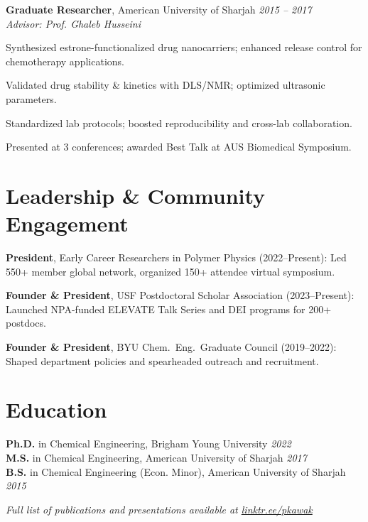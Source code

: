 \documentclass[letterpaper,12pt]{article}
\begin{document}
\textbf{Graduate Researcher}, American University of Sharjah \hfill \textit{2015 – 2017} \\
\textit{Advisor: Prof. Ghaleb Husseini}
\begin{tabitemize}[leftmargin=*]
  \item Synthesized estrone-functionalized drug nanocarriers; enhanced release control for chemotherapy applications.
  \item Validated drug stability \& kinetics with DLS/NMR; optimized ultrasonic parameters.
  \item Standardized lab protocols; boosted reproducibility and cross-lab collaboration.
  \item Presented at 3 conferences; awarded Best Talk at AUS Biomedical Symposium.
\end{tabitemize}

\vspace{-0.3\baselineskip}
\section*{Leadership \& Community Engagement}
\begin{tabitemize}[leftmargin=*]
  \item \textbf{President}, Early Career Researchers in Polymer Physics (2022–Present): Led 550+ member global network, organized 150+ attendee virtual symposium.
  \item \textbf{Founder \& President}, USF Postdoctoral Scholar Association (2023–Present): Launched NPA-funded ELEVATE Talk Series and DEI programs for 200+ postdocs.
  \item \textbf{Founder \& President}, BYU Chem.~Eng.~Graduate Council (2019–2022): Shaped department policies and spearheaded outreach and recruitment.
\end{tabitemize}

\vspace{-0.3\baselineskip}
\begin{refsection}[articles]
  \nocite{*}
  \setlength\bibitemsep{0pt}
  \printbibliography[resetnumbers=true,type=article,title={Selected Peer-Reviewed Publications},heading=fix]
\end{refsection}

\vspace{-0.3\baselineskip}
\section*{Education}
\textbf{Ph.D.} in Chemical Engineering, Brigham Young University \hfill \textit{2022} \\
\textbf{M.S.} in Chemical Engineering, American University of Sharjah \hfill \textit{2017} \\
\textbf{B.S.} in Chemical Engineering (Econ. Minor), American University of Sharjah \hfill \textit{2015}

\vspace{0.5em}
\noindent\textit{Full list of publications and presentations available at \href{https://linktr.ee/pkawak}{linktr.ee/pkawak}}
\end{document}
